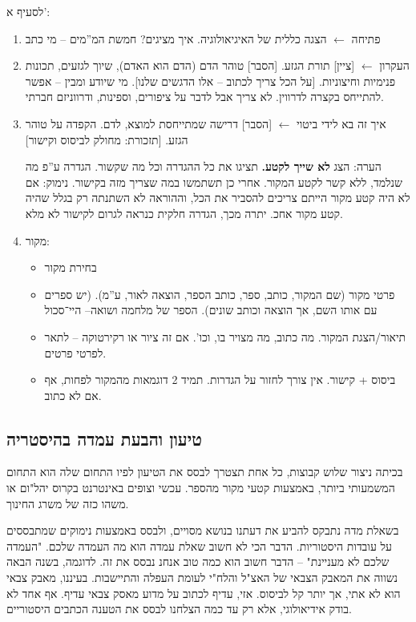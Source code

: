 \documentclass[a4paper]{book}
\begin{document}
	לסעיף א': 
	\begin{enumerate}
		\item פתיחה $\leftarrow$ הצגה כללית של האיגיאולוגיה. איך מציגים? חמשת המ''מים – מי כתב
		\item העקרון $\leftarrow$ [ציין] תורת הגזע. [הסבר] טוהר הדם (הדם הוא האדם), שיוך לגזעים, תכונות פנימיות וחיצוניות. [על הכל צריך לכתוב – אלו הדגשים שלנו]. מי שיודע ומבין – אפשר להתייחס בקצרה לדרווין. לא צריך אבל לדבר על ציפורים, וספינות, ודרווניזם חברתי. 
		\item איך זה בא לידי ביטוי $\leftarrow$ [הסבר] דרישה שמתייחסת למוצא, לדם. הקפדה על טוהר הגזע. [תזכורת: מחולק לביסוס וקישור]
		
		הערה: הצג \textbf{לא שייך לקטע. }תציגו את כל ההגדרה וכל מה שקשור. הגדרה ע''פ מה שנלמד, ללא קשר לקטע המקור. אחרי כן תשתמשו במה שצריך מזה בקישור. נימוק: אם לא היה קטע מקור הייתם צריכים להסביר את הכל, וההוראה לא השתנתה רק בגלל שהיה קטע מקור אחכ. יתרה מכך, הגדרה חלקית כנראה לגרום לקישור לא מלא. 
		
		\item מקור: 
		\begin{itemize}
			\item בחירת מקור
			\item פרטי מקור (שם המקור, כותב, ספר, כותב הספר, הוצאה לאור, ע''מ). (יש ספרים עם אותו השם, אך הוצאה וכותב שונים). הספר של מלחמה ושואה– היי־סכול
			\item תיאור/הצגת המקור. מה כתוב, מה מצויר בו, וכו'. אם זה ציור או רקירטוקה – לתאר לפרטי פרטים. 
			\item ביסוס + קישור. אין צורך לחזור על הגדרות. תמיד 2 דוגמאות מהמקור לפחות, אף אם לא כתוב. 
		\end{itemize}
	\end{enumerate}
	
	
	
	\subsection{טיעון והבעת עמדה בהיסטריה}
	בכיתה ניצור שלוש קבוצות, כל אחת תצטרך לבסס את הטיעון לפיו התחום שלה הוא התחום המשמעותי ביותר, באמצעות קטעי מקור מהספר. 
	עכשי וצופים באינטרנט בקרוס יהל"ום או משהו כזה של משרג החינוך. 
	
	בשאלת מדה נתבקס להביע את דעתנו בנושא מסויים, ולבסס באמצעות נימוקים שמתבססים על עובדות היסטוריות. הדבר הכי לא חשוב שאלת עמדה הוא מה העמדה שלכם. "העמדה שלכם לא מעניינת" – הדבר חשוב הוא כמה טוב אנחנ נבסס את זה. לדוגמה, בשנה הבאה נשווה את המאבק הצבאי של האצ"ל והלח"י לעומת העפלה והתיישבות. בעיננו, מאבק צבאי הוא לא אתי, אך יותר קל לביסוס. אזי, עדיף לכתוב על מדוע מאסק צבאי עדיף. אף אחד לא בודק אידיאולוגי, אלא רק עד כמה הצלחנו לבסס את הטענה הכתבים היסטוריים. 
	
\end{document}
